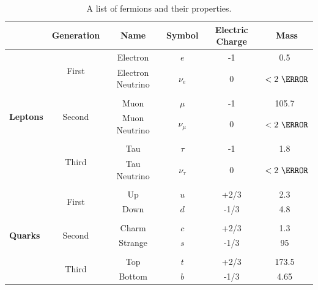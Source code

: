 \begin{table}[!h]
\begin{center}
\begin{tabular}{|l|ccccc|}
\hline
           								& Generation                & Name      & Symbol & Electric Charge  & Mass \\
\hline\hline
\multirow{8}{*}{{\bf Leptons}}  &  \multirow{2}{*}{First}		& Electron  & $e$    & -1  & 0.5~\MeV \\
													& 								& Electron Neutrino   & $\nu_e$&  0  & $<2~\eV$ \\
					& & & & & \\
													& \multirow{2}{*}{Second} & Muon   & $\mu$  & -1 & 105.7~\MeV \\
													& 								& Muon Neutrino      & $\nu_\mu$ & 0 & $<2~\eV$ \\
					& & & & & \\
													& \multirow{2}{*}{Third} & Tau  & $\tau$  & -1 & 1.8~\GeV \\
													& 								& Tau Neutrino      & $\nu_\tau$ & 0 & $<2~\eV$ \\
\hline
					& & & & & \\
\multirow{8}{*}{{\bf Quarks}}  &  \multirow{2}{*}{First}		& Up  & $u$  & +2/3  & 2.3~\MeV \\
													& 								& Down          & $d$  & -1/3  & 4.8~\MeV \\
					& & & & & \\
													& \multirow{2}{*}{Second} & Charm & $c$  & +2/3  & 1.3~\GeV \\
													& 								& Strange       & $s$  & -1/3  & 95~\MeV \\
					& & & & & \\
													& \multirow{2}{*}{Third} & Top    & $t$  & +2/3  & 173.5~\GeV \\
													& 								& Bottom        & $b$  & -1/3  & 4.65~\GeV \\
\hline
\end{tabular}
\end{center}
\caption{A list of fermions and their properties.}
\label{tab:fermions}
\end{table}


